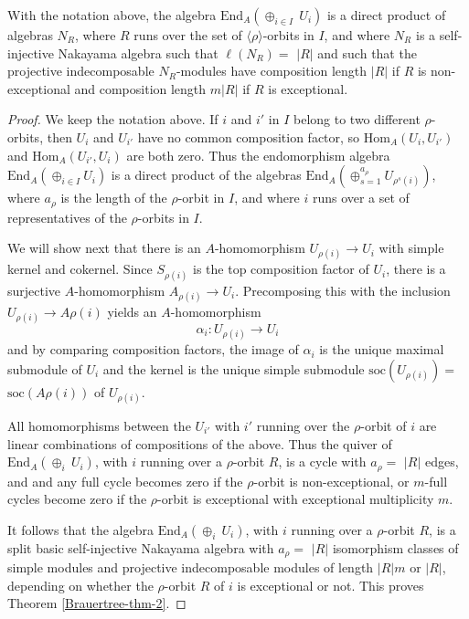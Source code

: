 \documentclass[10pt,a4paper]{amsart}
\def\End{\mathrm{End}}
\def\Hom{\mathrm{Hom}}           \def\tenkS{\otimes_{kS}}
\def\soc{\mathrm{soc}}           \def\tenOS{\otimes_{\mathcal{O}S}}
\begin{document}
\begin{Theorem} \label{Brauertree-thm-2}
With the notation above,  the algebra $\End_A(\oplus_{i\in I}\ U_i)$ is a direct 
product of algebras $N_R$, where $R$ runs over the set of
$\langle\rho\rangle$-orbits in $I$, and where $N_R$ is a self-injective Nakayama algebra
such that $\ell(N_R)=$ $|R|$ and such that the projective indecomposable
$N_R$-modules have composition length $|R|$ if $R$ is non-exceptional and
composition length $m|R|$ if $R$ is exceptional.
\end{Theorem} 

\begin{proof}
We keep the notation above. 
If $i$ and $i'$ in $I$ belong to two different $\rho$-orbits, then $U_i$ and $U_{i'}$ have 
no common composition factor, so $\Hom_A(U_i,U_{i'})$ and $\Hom_A(U_{i'}, U_i)$ are
both zero. Thus the endomorphism algebra $\End_A(\oplus_{i\in I} U_i)$ is a direct
product of the algebras $\End_A(\oplus_{s=1}^{a_\rho} U_{\rho^s(i)})$, where
$a_\rho$ is the length of the $\rho$-orbit in $I$, and where $i$ runs over a set
of representatives of the $\rho$-orbits in $I$.

We will show next that there is an $A$-homomorphism $U_{\rho(i)}\to U_i$
with simple kernel and cokernel.
Since $S_{\rho(i)}$ is the top composition factor of $U_i$, there is a surjective
$A$-homomorphism $A_{\rho(i)}\to U_i$. Precomposing this with the
inclusion $U_{\rho(i)}\to A\rho(i)$ yields an $A$-homomorphism
$$\alpha_i : U_{\rho(i)} \to U_i$$
and by comparing composition factors, the image of $\alpha_i$ is the unique
maximal submodule of $U_i$ and the kernel is the unique simple submodule
$\soc(U_{\rho(i)})=$ $\soc(A\rho(i))$ of $U_{\rho(i)}$.

All homomorphisms between the $U_{i'}$ with $i'$ running over the 
$\rho$-orbit of $i$ are linear combinations of compositions of the above.
Thus the quiver of $\End_A(\oplus_{i}\ U_i)$, with $i$ running over a $\rho$-orbit
$R$, is a cycle with $a_\rho=$ $|R|$ edges, and and any full cycle becomes zero if the
$\rho$-orbit is non-exceptional, or $m$-full cycles become zero if the $\rho$-orbit
is exceptional with exceptional multiplicity $m$.
 
It follows that the algebra $\End_A(\oplus_{i}\ U_i)$, with $i$ running over a
$\rho$-orbit $R$, is a split basic  self-injective Nakayama algebra with $a_\rho=$
$|R|$  isomorphism 
classes of simple modules and projective indecomposable modules of 
length $|R| m$ or $|R| $, depending on whether the $\rho$-orbit $R$ of $i$
is exceptional or not.
This proves Theorem \ref{Brauertree-thm-2}.
\end{proof}
\end{document}
